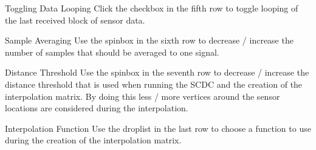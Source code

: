 \begin{aims}
	\item[\hspace*{10mm} Toggling Data Looping] Click the checkbox in the fifth row to toggle looping of the last received block of sensor data. 
\end{aims}

\begin{aims}
	\item[\hspace*{10mm} Sample Averaging] Use the spinbox in the sixth row to decrease / increase the number of samples that should be averaged to one signal. 
\end{aims}

\begin{aims}
	\item[\hspace*{10mm} Distance Threshold] Use the spinbox in the seventh row to decrease / increase the distance threshold that is used when running the SCDC and the creation of the interpolation matrix. By doing this less / more vertices around the sensor locations are considered during  the interpolation. 
\end{aims}

\begin{aims}
	\item[\hspace*{10mm} Interpolation Function] Use the droplist in the last row to choose a function to use during the creation of the interpolation matrix. 
\end{aims}

